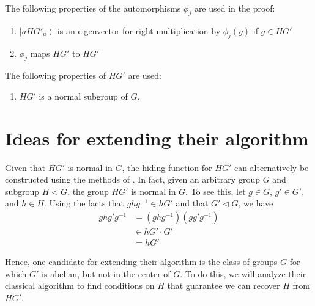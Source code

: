 \documentclass[conference]{IEEEtran}
\newcommand{\ket}[1]{\left| #1 \right\rangle}
\begin{document}
The following properties of the automorphisms $\phi_j$ are used in the proof:
\begin{enumerate}
\item $\ket{aHG'_u}$ is an eigenvector for right multiplication by $\phi_j(g)$ if $g \in HG'$
\item $\phi_j$ maps $HG'$ to $HG'$
\end{enumerate}

The following properties of $HG'$ are used:
\begin{enumerate}
\item $HG'$ is a normal subgroup  of $G$.  
\end{enumerate}

\section{Ideas for extending their algorithm}

Given that $HG'$ is normal in $G$, the hiding function for $HG'$ can alternatively be constructed using the methods of \cite{HRT00}.  In fact, given an arbitrary group $G$ and subgroup $H < G$, the group $HG'$ is normal in $G$.  To see this, let $g \in G$, $g' \in G'$, and $h \in H$.  Using the facts that $ghg^{-1} \in hG'$ and that $G' \triangleleft G$, we have
\begin{align*}
ghg'g^{-1} & = (ghg^{-1}) (g g' g^{-1}) \\
& \in h G' \cdot G' \\
& = h G'
\end{align*}

Hence, one candidate for extending their algorithm is the class of groups $G$ for which $G'$ is abelian, but not in the center of $G$.    To do this, we will analyze their classical algorithm to find conditions on $H$ that guarantee we can recover $H$ from $HG'$.
\end{document}
